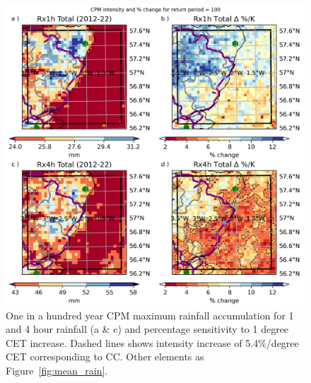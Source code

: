\documentclass[11pt,a4paper]{article}
\begin{document}
\begin{figure}
	\centering
	\includegraphics[width=1\linewidth]{cpm_intensity_delta}
	\caption{One in a hundred year CPM maximum rainfall accumulation for 1 and 4 hour rainfall (a \& c) and percentage sensitivity to 1 degree CET increase. Dashed lines shows intensity increase of 5.4\%/degree CET corresponding to CC. Other elements as Figure~\ref{fig:mean_rain}.  }
	\label{fig:map_intensity}
\end{figure}
\end{document}
